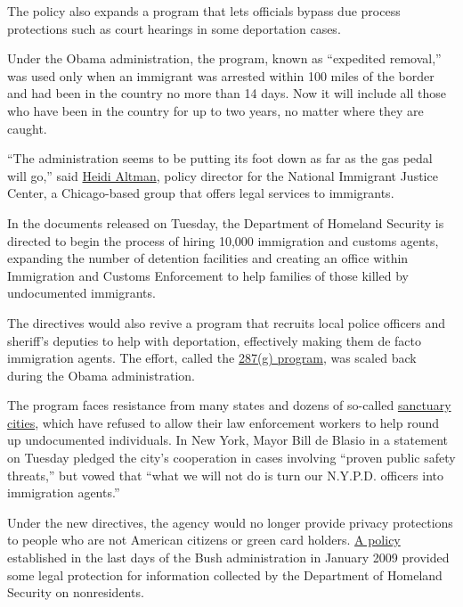 The policy also expands a program that lets officials bypass due process
protections such as court hearings in some deportation cases.

Under the Obama administration, the program, known as ``expedited
removal,'' was used only when an immigrant was arrested within 100 miles
of the border and had been in the country no more than 14 days. Now it
will include all those who have been in the country for up to two years,
no matter where they are caught.

``The administration seems to be putting its foot down as far as the gas
pedal will go,'' said
\href{http://www.immigrantjustice.org/nijc-staff}{Heidi Altman}, policy
director for the National Immigrant Justice Center, a Chicago-based
group that offers legal services to immigrants.

In the documents released on Tuesday, the Department of Homeland
Security is directed to begin the process of hiring 10,000 immigration
and customs agents, expanding the number of detention facilities and
creating an office within Immigration and Customs Enforcement to help
families of those killed by undocumented immigrants.

The directives would also revive a program that recruits local police
officers and sheriff's deputies to help with deportation, effectively
making them de facto immigration agents. The effort, called the
\href{https://www.ice.gov/factsheets/287g}{287(g) program}, was scaled
back during the Obama administration.

The program faces resistance from many states and dozens of so-called
\href{https://www.nytimes.com/2017/01/31/us/san-francisco-lawsuit-trump-sanctuary-cities.html}{sanctuary
cities}, which have refused to allow their law enforcement workers to
help round up undocumented individuals. In New York, Mayor Bill de
Blasio in a statement on Tuesday pledged the city's cooperation in cases
involving ``proven public safety threats,'' but vowed that ``what we
will not do is turn our N.Y.P.D. officers into immigration agents.''

Under the new directives, the agency would no longer provide privacy
protections to people who are not American citizens or green card
holders.
\href{https://www.dhs.gov/xlibrary/assets/privacy/privacy_policyguide_2007-1.pdf}{A
policy} established in the last days of the Bush administration in
January 2009 provided some legal protection for information collected by
the Department of Homeland Security on nonresidents.


